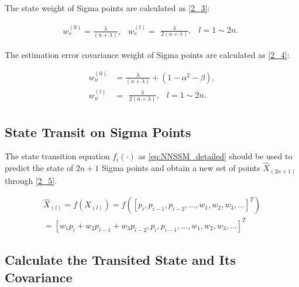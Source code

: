 \documentclass[sn-nature]{sn-jnl}%
\theoremstyle{thmstyleone}%
\theoremstyle{thmstyletwo}%
\theoremstyle{thmstylethree}%
\begin{document}
The state weight of Sigma points are calculated as \eqref{2_3}:

\begin{equation}
\begin{array}{*{20}{c}}
{w_{^S}^{(0)} = \frac{\lambda }{{(n + \lambda )}},}&{w_{^S}^{(l)} = \begin{array}{*{20}{c}}
{\frac{\lambda }{{2(n + \lambda )}},}&{l = 1\sim 2n}.
\end{array}}
\end{array}
\label{2_3}
\end{equation}

The estimation error covariance weight of Sigma points are calculated as \eqref{2_4}:

\begin{equation}
\begin{aligned}
w_{^\Pi }^{(0)} &= \frac{\lambda }{{(n + \lambda )}} + (1 - {\alpha ^2} - \beta ),\\
w_{^\Pi }^{(l)} &= \begin{array}{*{20}{c}}
{\frac{\lambda }{{2(n + \lambda )}},}&{l = 1\sim 2n}.
\end{array}
\end{aligned}
\label{2_4}
\end{equation}

\subsection{State Transit on Sigma Points}
The state transition equation ${f_i}( \cdot )$ as \eqref{eq:NNSSM_detailed} should be used to predict the state of $2n+1$ Sigma points and obtain a new set of points ${{\hat X}_{(2n+1)}}$ through \eqref{2_5}.

\begin{equation}
\begin{array}{l}
{{\hat X}_{(l)}} = f({X_{(l)}}) = f(\left[ {{p_i},{p_{i - 1}},{p_{i - 2}},...,{w_1},{w_2},{w_3},...} \right]^T)\\
 = \left[ {{w_1}{p_i} + {w_2}{p_{i - 1}} + {w_3}{p_{i - 2}},{p_i},{p_{i - 1}},...,{w_1},{w_2},{w_3},...} \right]^T
\end{array}
\label{2_5}
\end{equation}

\subsection{Calculate the Transited State and Its Covariance}
\end{document}
